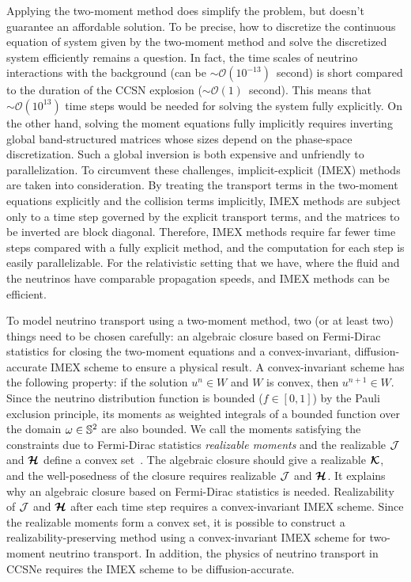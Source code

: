 Applying the two-moment method does simplify the problem, but doesn't guarantee an affordable solution.
To be precise, how to discretize the continuous equation of system given by the two-moment method and solve the discretized system efficiently remains a question.
In fact, the time scales of neutrino interactions with the background (can be $\sim\mathcal{O}(10^{-13})$~second) is short compared to the duration of the CCSN explosion ($\sim\mathcal{O}(1)$~second).  
This means that $\sim\mathcal{O}(10^{13})$ time steps would be needed for solving the system fully explicitly. 
On the other hand, solving the moment equations fully implicitly requires inverting global band-structured matrices whose sizes depend on the phase-space discretization.
Such a global inversion is both expensive and unfriendly to parallelization.
To circumvent these challenges, implicit-explicit (IMEX) methods are taken into consideration.
By treating the transport terms in the two-moment equations explicitly and the collision terms implicitly, IMEX methods are subject only to a time step governed by the explicit transport terms, and the matrices to be inverted are block diagonal.
Therefore, IMEX methods require far fewer time steps compared with a fully explicit method, and the computation for each step is easily parallelizable.
For the relativistic setting that we have, where the fluid and the neutrinos have comparable propagation speeds, and IMEX methods can be efficient.

To model neutrino transport using a two-moment method, two (or at least two) things need to be chosen carefully: an algebraic closure based on Fermi-Dirac statistics for closing the two-moment equations and a convex-invariant, diffusion-accurate IMEX scheme to ensure a physical result.
A convex-invariant scheme has the following property: if the solution $u^{n}\in W$ and $W$ is convex, then $u^{n+1}\in W$.
Since the neutrino distribution function is bounded ($f\in[0,1]$) by the Pauli exclusion principle, its moments as weighted integrals of a bounded function over the domain $\omega\in\mathbb{S}^{2}$ are also bounded.
We call the moments satisfying the constraints due to Fermi-Dirac statistics \textit{realizable moments} and the realizable $\mathcal{J}$ and $\boldsymbol{\mathcal{H}}$ define a convex set~\cite{chu_etal_2018}.
The algebraic closure should give a realizable $\boldsymbol{\mathcal{K}}$, and the well-posedness of the closure requires realizable $\mathcal{J}$ and $\boldsymbol{\mathcal{H}}$.
It explains why an algebraic closure based on Fermi-Dirac statistics is needed.
Realizability of $\mathcal{J}$ and $\boldsymbol{\mathcal{H}}$ after each time step requires a convex-invariant IMEX scheme.
Since the realizable moments form a convex set, it is possible to construct a realizability-preserving method using a convex-invariant IMEX scheme for two-moment neutrino transport.
In addition, the physics of neutrino transport in CCSNe requires the IMEX scheme to be diffusion-accurate.

